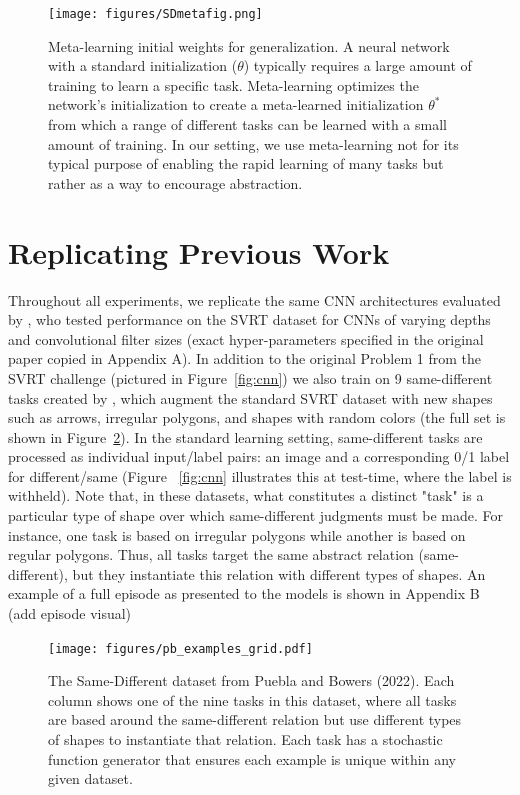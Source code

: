 \documentclass[10pt,letterpaper]{article}
\begin{document}
\begin{figure}[t]
    \centering
    \texttt{[image: figures/SDmetafig.png]}
    \caption{Meta-learning initial weights for generalization. A neural network with a standard initialization ($\theta$) typically requires a large amount of training to learn a specific task. Meta-learning optimizes the network's initialization to create a meta-learned initialization $\theta^*$ from which a range of different tasks can be learned with a small amount of training. In our setting, we use meta-learning not for its typical purpose of enabling the rapid learning of many tasks but rather as a way to encourage abstraction.}
    \label{fig:metaexplanatory}
\end{figure}



\section{Replicating Previous Work}

Throughout all experiments, we replicate the same CNN architectures evaluated by , who tested performance on the SVRT dataset for CNNs of varying depths and convolutional filter sizes (exact hyper-parameters specified in the original paper copied in Appendix A). In addition to the original Problem 1 from the SVRT challenge (pictured in Figure~\ref{fig:cnn}) we also train on 9 same-different tasks created by , which augment the standard SVRT dataset with new shapes such as arrows, irregular polygons, and shapes with random colors (the full set is shown in Figure~\ref{fig:augmented}). In the standard learning setting, same-different tasks are processed as individual input/label pairs: an image and a corresponding 0/1 label for different/same (Figure ~\ref{fig:cnn} illustrates this at test-time, where the label is withheld). Note that, in these datasets, what constitutes a distinct "task" is a particular type of shape over which same-different judgments must be made. For instance, one task is based on irregular polygons while another is based on regular polygons. Thus, all tasks target the same abstract relation (same-different), but they instantiate this relation with different types of shapes. An example of a full episode as presented to the models is shown in Appendix B (add episode visual)


\begin{figure}[bt]
    \centering
    \texttt{[image: figures/pb\_examples\_grid.pdf]}
    \caption{The Same-Different dataset from Puebla and Bowers (2022). Each column shows one of the nine tasks in this dataset, where all tasks are based around the same-different relation but use different types of shapes to instantiate that relation. Each task has a stochastic function generator that ensures each example is unique within any given dataset. }
    \label{fig:augmented}
\end{figure}
\end{document}
